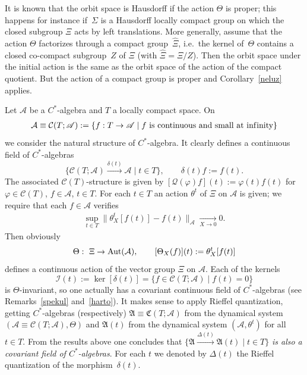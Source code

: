 \documentclass[pdftex]{sigma}
\def\A{{\mathcal A}}
\def\th{\theta}
\def\Th{\Theta}
\def\AA{\mathfrak A}
\def\C{\mathcal{C}}
\def\Q{\mathcal Q}
\def\CC{{\mathfrak C}}
\def\Si{\Sigma}
\providecommand{\CC}{\mathfrak{C}}
\begin{document}
\begin{Remark}\label{marcu}
It is known that the orbit space is Hausdorf\/f if the action $\Th$ is proper; this happens for instance if~$\Si$ is a Hausdorf\/f locally compact group on which the closed subgroup $\Xi$ acts by
left translations. More generally, assume that the action $\Th$ factorizes
through a compact group~$\widehat \Xi$,
i.e.\ the kernel of~$\Th$ contains a closed co-compact subgroup~$Z$ of $\Xi$ (with $\widehat \Xi=\Xi/Z$).
Then the orbit space under the initial action is the same as the orbit space of the
action of the compact quotient. But the action of a compact group is proper and Corollary~\ref{neluz} applies.
\end{Remark}



\begin{Example}\label{primu}
Let $\mathscr A$ be a $C^*$-algebra and $T$ a locally compact space. On
\begin{gather*}%
\A\equiv\C(T;\mathscr A):=\{f:T\rightarrow\mathscr A\mid f\ \text{is continuous and small at inf\/inity}\}
\end{gather*}
we consider the natural structure of $C^*$-algebra. It clearly def\/ines a continuous f\/ield of $C^*$-algebras
\[
\big\{\C(T;\mathscr A)\overset{\delta(t)}{\longrightarrow}\mathscr A\mid t\in T\big\},\qquad \delta(t)f:=f(t).
\]
The associated $\C(T)$-structure is given by $\left[\Q(\varphi)f\right](t):=\varphi(t)f(t)$ for $\varphi\in\C(T)$, $f\in\A$, $t\in T$.
For each $t\in T$ an action $\th^t$ of $\Xi$ on $\mathscr A$ is given; we require that each $f\in\A$ verif\/ies
\begin{gather*}%
\sup_{t\in T}\| \th^t_X[f(t)]-f(t) \|_\mathscr A\underset{X\rightarrow 0}{\longrightarrow} 0.
\end{gather*}
Then obviously
\begin{gather*}%
\Th: \ \Xi\rightarrow{\rm Aut}(\A),\qquad [\Th_X(f)](t):=\th^t_X[f(t)]
\end{gather*}
def\/ines a continuous action of the vector group $\Xi$ on $\A$. Each of the kernels
\[
\mathcal I(t):=\ker[\delta(t)]=\{f\in\C(T;\mathscr A)\mid f(t)=0\}
\]
is $\Th$-invariant, so one actually has a covariant continuous f\/ield of $C^*$-algebras
(see Remarks~\ref{spekul} and~\ref{harto}).
It makes sense to apply Rief\/fel quantization, getting $C^*$-algebras (respectively)
$\AA\equiv\CC(T;\mathscr A)$ from the dynamical system $(\A\equiv\C(T;\mathscr A),\Th)$
and $\AA(t)$ from the dynamical system $(\mathscr A,\th^t)$ for all $t\in T$. From the results above one concludes that
$\big\{\AA\overset{\Delta(t)}{\longrightarrow}\AA(t)\mid t\in T\big\}$ {\it is also a covariant field of $C^*$-algebras}.
For each $t$ we denoted by $\Delta(t)$ the Rief\/fel quantization of the morphism~$\delta(t)$.
\end{Example}
\end{document}
